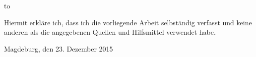 \thispagestyle{empty}
\vspace*{38\baselineskip}
\hbox to \textwidth{\hrulefill}
\par
Hiermit erkl\"are ich, dass ich die vorliegende Arbeit selbst\"andig verfasst und
keine anderen als die angegebenen Quellen und Hilfsmittel verwendet habe.

Magdeburg, den 23. Dezember 2015

\clearpage
